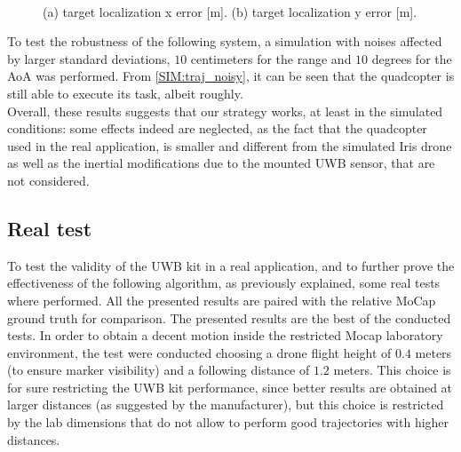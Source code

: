 \begin{figure}
     \centering     
     \\
     \caption{(a) target localization x error [m]. (b) target localization y error [m].}
     \label{SIM:loc err}
\end{figure}

To test the robustness of the following system, a simulation with noises affected by larger standard deviations, $10$ centimeters for the range and $10$ degrees for the AoA was performed. From \autoref{SIM:traj_noisy}, it can be seen that the quadcopter is still able to execute its task, albeit roughly.\\
Overall, these results suggests that our strategy works, at least in the simulated conditions: some effects indeed are neglected, as the fact that the quadcopter used in the real application, is smaller and different from the simulated Iris drone as well as the inertial modifications due to the mounted UWB sensor, that are not considered. 

\subsection{Real test}
To test the validity of the UWB kit in a real application, and to further prove the effectiveness of the following algorithm, as previously explained, some real tests where performed. All the presented results are paired with the relative MoCap ground truth for comparison. The presented results are the best of the conducted tests. In order to obtain a decent motion inside the restricted Mocap laboratory environment, the test were conducted choosing a drone flight height of $0.4$ meters (to ensure marker visibility) and a following distance of $1.2$ meters. This choice is for sure restricting the UWB kit performance, since better results are obtained at larger distances (as suggested by the manufacturer), but this choice is restricted by the lab dimensions that do not allow to perform good trajectories with higher distances.\\


